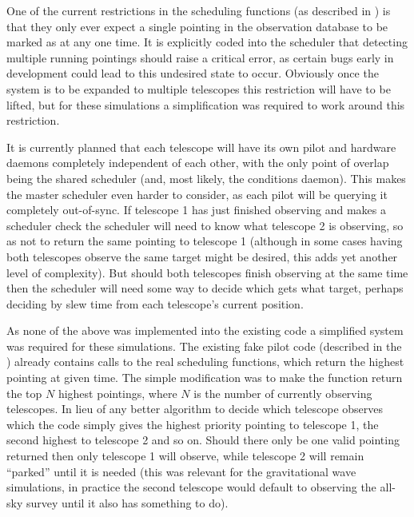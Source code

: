 \begin{colsection}
\begin{colsection}
One of the current restrictions in the scheduling functions (as described in ) is that they only ever expect a single pointing in the observation database to be marked as  at any one time. It is explicitly coded into the scheduler that detecting multiple running pointings should raise a critical error, as certain bugs early in development could lead to this undesired state to occur. Obviously once the system is to be expanded to multiple telescopes this restriction will have to be lifted, but for these simulations a simplification was required to work around this restriction.

It is currently planned that each telescope will have its own pilot and hardware daemons completely independent of each other, with the only point of overlap being the shared scheduler (and, most likely, the conditions daemon). This makes the master scheduler even harder to consider, as each pilot will be querying it completely out-of-sync. If telescope 1 has just finished observing and makes a scheduler check the scheduler will need to know what telescope 2 is observing, so as not to return the same pointing to telescope 1 (although in some cases having both telescopes observe the same target might be desired, this adds yet another level of complexity). But should both telescopes finish observing at the same time then the scheduler will need some way to decide which gets what target, perhaps deciding by slew time from each telescope's current position.

As none of the above was implemented into the existing code a simplified system was required for these simulations. The existing fake pilot code (described in the ) already contains calls to the real scheduling functions, which return the highest pointing at given time. The simple modification was to make the function return the top $N$ highest pointings, where $N$ is the number of currently observing telescopes. In lieu of any better algorithm to decide which telescope observes which the code simply gives the highest priority pointing to telescope 1, the second highest to telescope 2 and so on. Should there only be one valid pointing returned then only telescope 1 will observe, while telescope 2 will remain ``parked'' until it is needed (this was relevant for the gravitational wave simulations, in practice the second telescope would default to observing the all-sky survey until it also has something to do).


\end{colsection}
\end{colsection}
